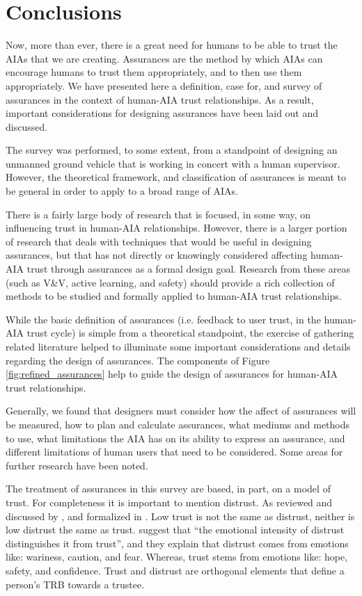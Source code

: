 \section{Conclusions}\label{sec:conclusions}
    Now, more than ever, there is a great need for humans to be able to trust the AIAs that we are creating. Assurances are the method by which AIAs can encourage humans to trust them appropriately, and to then use them appropriately. We have presented here a definition, case for, and survey of assurances in the context of human-AIA trust relationships. As a result, important considerations for designing assurances have been laid out and discussed.
    
    The survey was performed, to some extent, from a standpoint of designing an unmanned ground vehicle that is working in concert with a human supervisor. However, the theoretical framework, and classification of assurances is meant to be general in order to apply to a broad range of AIAs.

    There is a fairly large body of research that is focused, in some way, on influencing trust in human-AIA relationships. However, there is a larger portion of research that deals with techniques that would be useful in designing assurances, but that has not directly or knowingly considered affecting human-AIA trust through assurances as a formal design goal. Research from these areas (such as V\&V, active learning, and safety) should provide a rich collection of methods to be studied and formally applied to human-AIA trust relationships.

    While the basic definition of assurances (i.e. feedback to user trust, in the human-AIA trust cycle) is simple from a theoretical standpoint, the exercise of gathering related literature helped to illuminate some important considerations and details regarding the design of assurances. The components of Figure \ref{fig:refined_assurances} help to guide the design of assurances for human-AIA trust relationships.

    Generally, we found that designers must consider how the affect of assurances will be measured, how to plan and calculate assurances, what mediums and methods to use, what limitations the AIA has on its ability to express an assurance, and different limitations of human users that need to be considered. Some areas for further research have been noted.

    The treatment of assurances in this survey are based, in part, on a model of trust. For completeness it is important to mention distrust. As reviewed and discussed by \citet{Lewicki1998-ox}, and formalized in \cite{McKnight2001-hm,McKnight2001-gz}. Low trust is not the same as distrust, neither is low distrust the same as trust. \citet{McKnight2001-gz} suggest that ``the emotional intensity of distrust distinguishes it from trust'', and they explain that distrust comes from emotions like: wariness, caution, and fear. Whereas, trust stems from emotions like: hope, safety, and confidence. Trust and distrust are orthogonal elements that define a person's TRB towards a trustee. 

